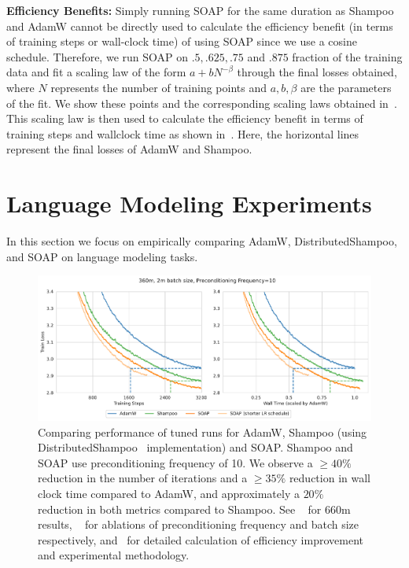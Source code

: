 \documentclass{article} %
\begin{document}
\textbf{Efficiency Benefits:} Simply running SOAP for the same duration as Shampoo and AdamW cannot be directly used to calculate the efficiency benefit (in terms of training steps or wall-clock time) of using SOAP since we use a cosine schedule. Therefore, we run SOAP on $.5, .625, .75$ and $.875$ fraction of the training data and fit a scaling law of the form $a + bN^{-\beta}$ through the final losses obtained, where $N$ represents the number of training points and $a,b,\beta$ are the parameters of the fit. We show these points and the corresponding scaling laws obtained in~. This scaling law is then used to calculate the efficiency benefit in terms of training steps and wallclock time as shown in~. Here, the horizontal lines represent the final losses of AdamW and Shampoo. 

\section{Language Modeling Experiments}
\label{sec:language}


In this section we focus on empirically comparing AdamW, DistributedShampoo, and SOAP on language modeling tasks. 
\begin{figure}[ht]
	\centering
	\includegraphics[width=1\linewidth]{figures/main_fig_360m.pdf}
	\caption{Comparing performance of tuned runs for AdamW, Shampoo (using DistributedShampoo~\citep{distributedshampoo} implementation) and SOAP. Shampoo and SOAP use preconditioning frequency of 10. We observe a $\geq 40\%$ reduction in the number of iterations and a $\geq 35\%$ reduction in wall clock time compared to AdamW, and approximately a $20\%$ reduction in both metrics compared to Shampoo. See ~ for 660m results, ~ for ablations of preconditioning frequency and batch size respectively, and~ for detailed calculation of efficiency improvement and experimental methodology.}
	\label{fig:main360}
\end{figure}
\end{document}
